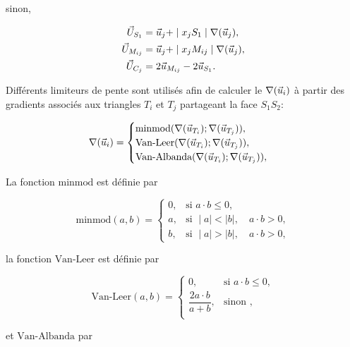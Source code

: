 \begin{appendix}
sinon, 

\begin{align*}
\vect{U}_{S_1} &=  \velocity_{j} + \mid x_j S_1 \mid \nabla(\velocity_j) ,\\
\vect{U}_{M_{ij}} &=  \velocity_{j} + \mid x_j M_{ij} \mid \nabla(\velocity_{j}) , \\
\vect{U}_{C_j} &= 2 \velocity_{M_{ij}} - 2\velocity_{S_1}.
\end{align*}



Diff\'erents limiteurs de pente sont utilis\'es afin de calculer le $\nabla(\velocity_{i})$ \`a partir des gradients associ\'es aux triangles $T_i$ et $T_j$ partageant la face $S_1S_2$:


$$ \nabla (\velocity_{i})  =
 \begin{cases}
   \text{minmod}(\nabla(\velocity_{T_i}); \nabla(\velocity_{T_j})) ,\\
 \text{Van-Leer} (\nabla(\velocity_{T_i}); \nabla(\velocity_{T_j})) , \\
\text{Van-Albanda}(\nabla(\velocity_{T_i}); \nabla(\velocity_{T_j})) , 
\end{cases}
$$


La fonction $\text{minmod}$ est d\'efinie par 

\begin{equation*}
\text{minmod} (a,b)=\begin{cases}0, & \text{si } a \cdot b \leq 0, \\ 
a, & \text{si } \mid a \mid <   \mid b \mid , \quad a \cdot b > 0,\\
b, &  \text{si } \mid a \mid >  \mid b \mid , \quad a \cdot b > 0, \end{cases}
\end{equation*} 

la fonction $\text{Van-Leer} $ est d\'efinie par

\begin{equation*}
\text{Van-Leer} (a,b)=\begin{cases}0, & \text{si } a \cdot b \leq 0, \\ 
\dfrac{2 a \cdot b}{ a + b}, & \text{sinon },\\
 \end{cases}
\end{equation*} 

et $\text{Van-Albanda}$ par


\end{appendix}
